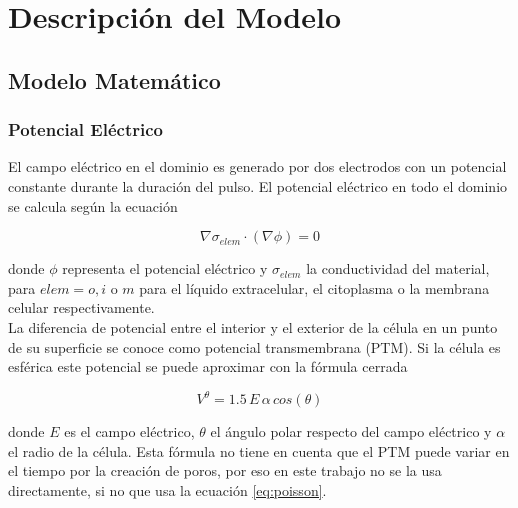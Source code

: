 \chapter{Descripción del Modelo}



\section{Modelo Matemático}

\subsection*{Potencial Eléctrico}
El campo eléctrico en el dominio es generado por dos electrodos con un potencial constante durante la duración del pulso. El potencial eléctrico en todo el dominio se calcula según la ecuación 

\begin{equation} \label{eq:poisson}
	\nabla \sigma_{elem} \cdot (\nabla \phi) = 0 
\end{equation}

donde $\phi$ representa el potencial eléctrico y $\sigma_{elem}$ la conductividad del material, para $elem = o, i$ o $m$ para el líquido extracelular, el citoplasma o la membrana celular respectivamente.\\

La diferencia de potencial entre el interior y el exterior de la célula en un punto de su superficie se conoce como potencial transmembrana (PTM). Si la célula es esférica este potencial se puede aproximar con la fórmula cerrada

\begin{equation} \label{eq:cos}
	V^{\theta} = 1.5\, E\, \alpha\, cos (\theta)
\end{equation}

donde $E$ es el campo eléctrico, $\theta$ el ángulo polar respecto del campo eléctrico y $\alpha$ el radio de la célula. Esta fórmula no tiene en cuenta que el PTM puede variar en el tiempo por la creación de poros, por eso en este trabajo no se la usa directamente, si no que usa la ecuación \ref{eq:poisson}.

